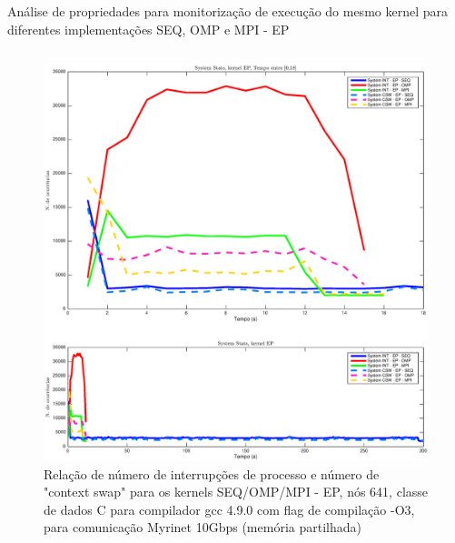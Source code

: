 \documentclass{beamer}
\begin{document}
\begin{frame}{ \tiny Análise de propriedades para monitorização de execução do mesmo kernel para diferentes implementações SEQ, OMP e MPI - EP}
\begin{columns}[t]
\begin{figure}[H]
\centering
\includegraphics[width=0.9\columnwidth]{EPS/dstat_EP_seq_vs_omp_vs_mpi/system.eps}
\caption{\tiny Relação de número de interrupções de processo e número de "context swap" para os kernels SEQ/OMP/MPI - EP, nós 641, classe de dados C para compilador gcc 4.9.0 com flag de compilação  -O3, para comunicação Myrinet 10Gbps (memória partilhada)}
\label{dstat_ep_SOM_system}
\end{figure}
\end{columns}

\end{frame}
\end{document}
